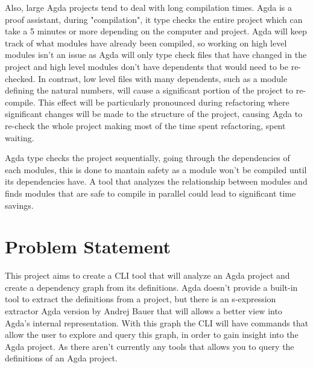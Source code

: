 Also, large Agda projects tend to deal with long compilation times. Agda is a
proof assistant, during "compilation", it type checks the entire project which
can take a 5 minutes or more depending on the computer and project. Agda will
keep track of what modules have already been compiled, so working on high level
modules isn't an issue as Agda will only type check files that have changed in
the project and high level modules don't have dependents that would need to be
re-checked. In contrast, low level files with many dependents, such as a module
defining the natural numbers, will cause a significant portion of the project
to re-compile. This effect will be particularly pronounced during refactoring
where significant changes will be made to the structure of the project, causing
Agda to re-check the whole project making most of the time spent refactoring,
spent waiting. 

Agda type checks the project sequentially, going through the dependencies of
each modules, this is done to mantain safety as a module won't be compiled
until its dependencies have. A tool that analyzes the relationship between
modules and finds modules that are safe to compile in parallel could lead to
significant time savings.




\section{Problem Statement}

This project aims to create a CLI tool that will analyze an Agda project and
create a dependency graph from its definitions. Agda doesn't provide a built-in
tool to extract the definitions from a project, but there is an s-expression
extractor Agda version by Andrej Bauer \cite{andrej} that will allows a better
view into Agda's internal representation. With this graph the CLI will have
commands that allow the user to explore and query this graph, in order to gain
insight into the Agda project. As there aren't currently any tools that allows
you to query the definitions of an Agda project.

